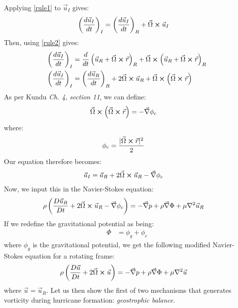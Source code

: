 Applying \ref{rule1} to $\vec{u}_I$ gives:
\begin{align*}
    \left(\frac{d\vec{u}_I}{dt}\right)_I &= \left(\frac{d\vec{u}_I}{dt}\right)_R+\vec{\Omega}\cross\vec{u}_I
\end{align*}
Then, using \ref{rule2} gives:
\begin{align*}
    \left(\frac{d\vec{u}_I}{dt}\right)_I &= \frac{d}{dt}\left(\vec{u}_R+\vec{\Omega}\cross\vec{r}\right)_R+\vec{\Omega}\cross\left(\vec{u}_R+\vec{\Omega}\cross\vec{r}\right)_R\\
    \left(\frac{d\vec{u}_I}{dt}\right)_I &= \left(\frac{d\vec{u}_R}{dt}\right)_R+2\vec{\Omega}\cross\vec{u}_R+\vec{\Omega}\cross\left(\vec{\Omega}\cross\vec{r}\right)
\end{align*}
As per Kundu \cite{cohen2004fluid} \textit{Ch. 4, section 11}, we can define:
\begin{align*}
    \vec{\Omega}\cross\left(\vec{\Omega}\cross\vec{r}\right) &= -\vec{\nabla}\phi_c
\end{align*}
where:
\begin{align*}
    \phi_c &= \frac{\vert \vec{\Omega}\cross\vec{r}\vert^2}{2}
\end{align*}
Our equation therefore becomes:
\begin{align*}
    \vec{a}_I &= \vec{a}_R+2\vec{\Omega}\cross\vec{u}_R-\vec{\nabla}\phi_c
\end{align*}
Now, we input this in the Navier-Stokes equation:
\begin{align*}
    \rho\left(\frac{D\vec{u}_R}{Dt}+2\vec{\Omega}\cross\vec{u}_R-\vec{\nabla}\phi_c\right) &=-\vec{\nabla}p+\rho\vec{\nabla}\Phi+\mu\nabla^2 \vec{u}_R 
\end{align*}
If we redefine the gravitational potential as being:
\begin{align*}
    \Phi &= \phi_g+\phi_c
\end{align*}
where $\phi_g$ is the gravitational potential, we get the following modified Navier-Stokes equation for a rotating frame:
\begin{align*}
    \rho\left(\frac{D\vec{u}}{Dt}+2\vec{\Omega}\cross\vec{u}\right) &=-\vec{\nabla}p+\rho\vec{\nabla}\Phi+\mu\nabla^2 \vec{u} 
\end{align*}
where $\vec{u}=\vec{u}_R$. Let us then show the first of two mechanisms that generates vorticity during hurricane formation: \textit{geostrophic balance}.


